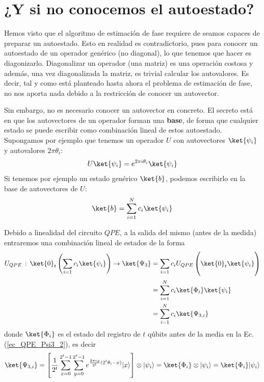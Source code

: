 \documentclass[a4paper,11pt]{book} %
\numberwithin{equation}{chapter}
\def\lc{\left[}
\def\rc{\right]}
\begin{document}
\section{¿Y si no conocemos el autoestado?}

Hemos visto que el algoritmo de estimación de fase requiere de seamos capaces de preparar un autoestado. Esto en realidad es contradictorio, pues para conocer un autoestado de un operador genérico (no diagonal), lo que tenemos que hacer es diagonizarlo. Diagonalizar un operador (una matriz) es una operación costosa y además, una vez diagonalizada la matriz, es trivial calcular los autovalores. Es decir, tal y como está planteado hasta ahora el problema de estimación de fase, no nos aporta nada debido a la restricción de conocer un autovector. 

Sin embargo, no es necesario conocer un autovector en concreto. El secreto está en que los autovectores de un operador forman una \textbf{base}, de forma que cualquier estado se puede escribir como combinación lineal de estos autoestado. Supongamos por ejemplo que tenemos un operador $U$ con autovectores $\ket{\psi_i}$ y autovalores $2 \pi \theta_i$:
	\begin{equation} 
	U \ket{\psi_i} = e^{2 \pi i \theta_i} \ket{\psi_i}
	\end{equation}
Si tenemos por ejemplo un estado genérico $\ket{b}$, podemos escribirlo en la base de autovectores de $U$:
	\begin{equation} \label{ec_QPE_b_genérico}
	\ket{b} = \sum^N_{i=1} c_i \ket{\psi_i}
	\end{equation}

Debido a linealidad del circuito $QPE$, a la salida del mismo (antes de la medida) entraremos una combinación lineal de estados de la forma
	\begin{align*}
	U_{QPE}\, :\,\ket{0}_t \left(\sum_{i=1}c_i\ket{\psi_i}\right) \rightarrow \ket{\Psi_3} &= \sum_{i=1}c_i U_{QPE}\left(\ket{0}_t\ket{\psi_i} \rule{0mm}{7mm}\right)  \\ \rule{0mm}{7mm}
	& = \sum_{i=1}^N  c_i \ket{\Phi_i}\ket{\psi_i} \\ 
	& = \sum_{i=1}^N c_i \ket{\Psi_{3,i}}
	\end{align*}
donde $\ket{\Phi_i}$ es el estado del registro de $t$ qúbits antes de la media en la Ec. (\ref{ec_QPE_Psi3_2}), es decir
	\begin{equation}
	\ket{\Psi_{3,i}} = \lc \frac{1}{2^{t}} \sum_{x=0}^{2^t-1} \sum_{y=0}^{2^{t}-1}e^{\frac{2 \pi i y}{2^t} (2^t \theta_i - x)} |x\rangle \rc \otimes \vert\psi_i\rangle = \ket{\Phi_i} \otimes \vert\psi_i\rangle =  \ket{\Phi_i} \vert\psi_i\rangle
	\end{equation}
\end{document}
